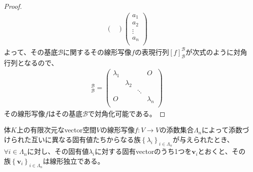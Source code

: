 \documentclass[dvipdfmx]{jsarticle}
\begin{document}
\begin{proof}
\begin{align*}
\begin{pmatrix}
\end{pmatrix}\begin{pmatrix}
a_{1} \\
a_{2} \\
 \vdots \\
a_{n} \\
\end{pmatrix}
\end{align*}
よって、その基底$\mathcal{B}$に関するその線形写像$f$の表現行列$[ f]_{\mathcal{B}}^{\mathcal{B}}$が次式のように対角行列となるので、
\begin{align*}
[ f]_{\mathcal{B}}^{\mathcal{B}} = \begin{pmatrix}
\lambda_{1} & \  & \  & O \\
\  & \lambda_{2} & \  & \  \\
\  & \  & \ddots & \  \\
O & \  & \  & \lambda_{n} \\
\end{pmatrix}
\end{align*}
その線形写像$f$はその基底$\mathcal{B}$で対角化可能である。
\end{proof}
\begin{thm}\label{2.2.2.13}
体$K$上の有限次元なvector空間$V$の線形写像$f:V \rightarrow V$の添数集合$\varLambda_{n}$によって添数づけられた互いに異なる固有値たちからなる族$\left\{ \lambda_{i} \right\}_{i \in \varLambda_{n}}$が与えられたとき、$\forall i \in \varLambda_{n}$に対し、その固有値$\lambda_{i}$に対する固有vectorのうち1つを$\mathbf{v}_{i}$とおくと、その族$\left\{ \mathbf{v}_i \right\}_{i \in \varLambda_{n} }$は線形独立である。
\end{thm}
\end{document}
